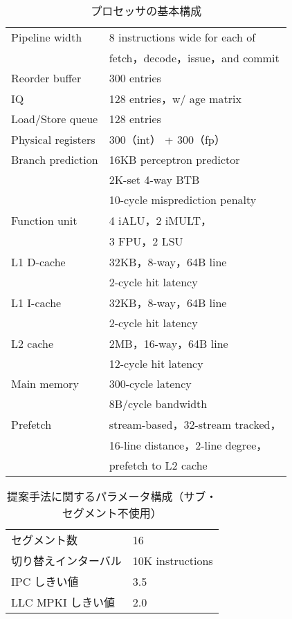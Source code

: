 \begin{table}[htb]
  \caption{プロセッサの基本構成}
  \footnotesize
  \center
    \begin{tabular}{l|l} \hline \hline
     Pipeline width & 8 instructions wide for each of \\
     & fetch，decode，issue，and commit \\
     Reorder buffer & 300 entries \\
     IQ & 128 entries，w/ age matrix \\
     Load/Store queue & 128 entries \\
     Physical registers & 300（int） + 300（fp） \\
     Branch prediction & 16KB perceptron predictor~\cite{Jimenez2001} \\
     & 2K-set 4-way BTB \\
     & 10-cycle misprediction penalty \\
     Function unit & 4 iALU，2 iMULT，\\
     &  3 FPU，2 LSU \\
     L1 D-cache & 32KB，8-way，64B line \\
      & 2-cycle hit latency \\
     L1 I-cache & 32KB，8-way，64B line \\
      &  2-cycle hit latency \\
     L2 cache & 2MB，16-way，64B line \\
      & 12-cycle hit latency \\  
     Main memory & 300-cycle latency \\
     & 8B/cycle bandwidth \\ 
     Prefetch & stream-based，32-stream tracked， \\ 
     & 16-line distance，2-line degree，\\
     & prefetch to L2 cache \\ \hline
  \end{tabular}
  \label{tab:base_config}
\end{table}

\begin{table}[tb]
  \caption{提案手法に関するパラメータ構成（サブ・セグメント不使用）}
  \footnotesize
  \center
    \begin{tabular}{l|l} \hline \hline
    セグメント数 & 16 \\
    切り替えインターバル & 10K instructions \\
    IPC しきい値 & 3.5 \\
    LLC MPKI しきい値 & 2.0 \\ \hline 
  \end{tabular}
  \label{tab:switch_config}
\end{table}

